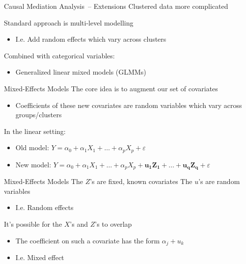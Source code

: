 \documentclass[14pt]{beamer}
\newcommand{\CMA}{Causal Mediation Analysis}
\newcommand{\GLMMs}{Mixed-Effects Models}
\begin{document}
\begin{frame}{\CMA\ -- Extensions}
    Clustered data more complicated \newline

    Standard approach is multi-level modelling
    \begin{itemize}
        \item I.e. Add random effects which vary across clusters \newline
    \end{itemize}

    Combined with categorical variables: 
    \begin{itemize}
        \item Generalized linear mixed models (GLMMs)
    \end{itemize}
\end{frame}


\begin{frame}{\GLMMs}
    The core idea is to augment our set of covariates
    \begin{itemize}
        \item Coefficients of these new covariates are random variables which vary across groups/clusters \newline
    \end{itemize}

    In the linear setting:
    \begin{itemize}
        \item Old model: $Y = \alpha_0 + \alpha_1 X_1 + \ldots + \alpha_p X_p + \varepsilon$
        \item New model: $Y = \alpha_0 + \alpha_1 X_1 + \ldots + \alpha_p X_p + \mathbf{u_1 Z_1 + \ldots + u_q Z_q} + \varepsilon$ \newline
    \end{itemize}

    


\end{frame}

\begin{frame}{\GLMMs}
    The $Z$'s are fixed, known covariates
    The $u$'s are random variables
    \begin{itemize}
        \item I.e. Random effects \newline
    \end{itemize}

    It's possible for the $X$'s and $Z$'s to overlap
    \begin{itemize}
        \item The coefficient on such a covariate has the form $\alpha_j + u_{k}$
        \item I.e. Mixed effect
    \end{itemize}

\end{frame}
\end{document}
